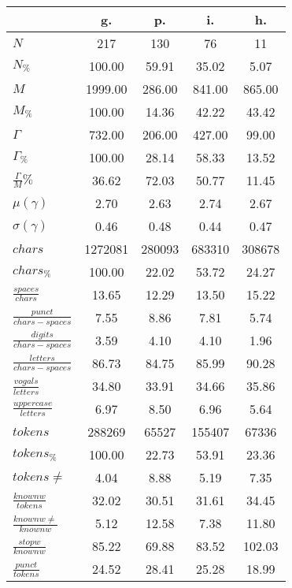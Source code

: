 \begin{table}[h!]
\begin{center}
\begin{tabular}{| l || c | c | c | c |}\hline
 & {\bf g.} & {\bf p.} & {\bf i.} & {\bf h.} \\\hline\hline
$N$ & 217  & 130  & 76  & 11 \\
$N_{\%}$ & 100.00  & 59.91  & 35.02  & 5.07 \\\hline
$M$ & 1999.00  & 286.00  & 841.00  & 865.00 \\
$M_{\%}$ & 100.00  & 14.36  & 42.22  & 43.42 \\\hline
$\Gamma$ & 732.00  & 206.00  & 427.00  & 99.00 \\
$\Gamma_{\%}$ & 100.00  & 28.14  & 58.33  & 13.52 \\\hline
$\frac{\Gamma}{M}\%$ & 36.62  & 72.03  & 50.77  & 11.45 \\
$\mu(\gamma)$ & 2.70  & 2.63  & 2.74  & 2.67 \\
$\sigma(\gamma)$ & 0.46  & 0.48  & 0.44  & 0.47 \\\hline\hline
$chars$ & 1272081  & 280093  & 683310  & 308678 \\
$chars_{\%}$ & 100.00  & 22.02  & 53.72  & 24.27 \\\hline
$\frac{spaces}{chars}$ & 13.65  & 12.29  & 13.50  & 15.22 \\
$\frac{punct}{chars-spaces}$ & 7.55  & 8.86  & 7.81  & 5.74 \\
$\frac{digits}{chars-spaces}$ & 3.59  & 4.10  & 4.10  & 1.96 \\\hline
$\frac{letters}{chars-spaces}$ & 86.73  & 84.75  & 85.99  & 90.28 \\
$\frac{vogals}{letters}$ & 34.80  & 33.91  & 34.66  & 35.86 \\
$\frac{uppercase}{letters}$ & 6.97  & 8.50  & 6.96  & 5.64 \\\hline\hline
$tokens$ & 288269  & 65527  & 155407  & 67336 \\
$tokens_{\%}$ & 100.00  & 22.73  & 53.91  & 23.36 \\
$tokens \neq$ & 4.04  & 8.88  & 5.19  & 7.35 \\\hline
$\frac{knownw}{tokens}$ & 32.02  & 30.51  & 31.61  & 34.45 \\
$\frac{knownw \neq}{knownw}$ & 5.12  & 12.58  & 7.38  & 11.80 \\\hline
$\frac{stopw}{knownw}$ & 85.22  & 69.88  & 83.52  & 102.03 \\
$\frac{punct}{tokens}$ & 24.52  & 28.41  & 25.28  & 18.99 \\

\end{tabular}
\end{center}
\end{table}
